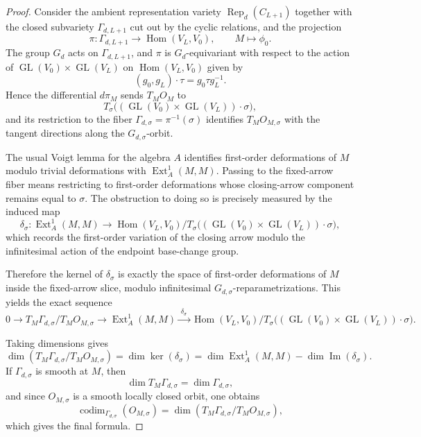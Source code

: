 \documentclass{article}
\newcommand{\Hom}{\operatorname{Hom}}
\newcommand{\Rep}{\operatorname{Rep}}
\newcommand{\codim}{\operatorname{codim}}
\newcommand{\Ext}{\operatorname{Ext}}
\newcommand{\GL}{\operatorname{GL}}
\theoremstyle{definition}
\begin{document}
\begin{proof}
Consider the ambient representation variety \(\Rep_d(C_{L+1})\) together with the closed subvariety
\(\Gamma_{d,L+1}\) cut out by the cyclic relations, and the projection
\[
\pi:\Gamma_{d,L+1}\to \Hom(V_L,V_0),\qquad M\mapsto \phi_0.
\]
The group \(G_d\) acts on \(\Gamma_{d,L+1}\), and \(\pi\) is \(G_d\)-equivariant with respect to the action of \(\GL(V_0)\times \GL(V_L)\) on \(\Hom(V_L,V_0)\) given by
\[
(g_0,g_L)\cdot \tau = g_0 \tau g_L^{-1}.
\]
Hence the differential \(d\pi_M\) sends \(T_M O_M\) to
\[
T_\sigma\!\bigl((\GL(V_0)\times \GL(V_L))\cdot \sigma\bigr),
\]
and its restriction to the fiber \(\Gamma_{d,\sigma}=\pi^{-1}(\sigma)\) identifies
\(T_M O_{M,\sigma}\) with the tangent directions along the \(G_{d,\sigma}\)-orbit.

The usual Voigt lemma for the algebra \(A\) identifies first-order deformations of \(M\) modulo
trivial deformations with \(\Ext_A^1(M,M)\). Passing to the fixed-arrow fiber means restricting
to first-order deformations whose closing-arrow component remains equal to \(\sigma\). The
obstruction to doing so is precisely measured by the induced map
\[
\delta_\sigma:\Ext_A^1(M,M)\to
\Hom(V_L,V_0)\big/ T_\sigma\!\bigl((\GL(V_0)\times \GL(V_L))\cdot \sigma\bigr),
\]
which records the first-order variation of the closing arrow modulo the infinitesimal action of the
endpoint base-change group.

Therefore the kernel of \(\delta_\sigma\) is exactly the space of first-order deformations of \(M\)
inside the fixed-arrow slice, modulo infinitesimal \(G_{d,\sigma}\)-reparametrizations. This yields the
exact sequence
\[
0
\longrightarrow
T_M\Gamma_{d,\sigma}/T_M O_{M,\sigma}
\longrightarrow
\Ext_A^1(M,M)
\xrightarrow{\;\delta_\sigma\;}
\Hom(V_L,V_0)\big/ T_\sigma\!\bigl((\GL(V_0)\times \GL(V_L))\cdot \sigma\bigr).
\]

Taking dimensions gives
\[
\dim\!\left(T_M\Gamma_{d,\sigma}/T_M O_{M,\sigma}\right)
=
\dim\ker(\delta_\sigma)
=
\dim\Ext_A^1(M,M)-\dim\operatorname{Im}(\delta_\sigma).
\]
If \(\Gamma_{d,\sigma}\) is smooth at \(M\), then
\[
\dim T_M\Gamma_{d,\sigma}=\dim \Gamma_{d,\sigma},
\]
and since \(O_{M,\sigma}\) is a smooth locally closed orbit, one obtains
\[
\codim_{\Gamma_{d,\sigma}}(O_{M,\sigma})
=
\dim\!\left(T_M\Gamma_{d,\sigma}/T_M O_{M,\sigma}\right),
\]
which gives the final formula.
\end{proof}
\end{document}
